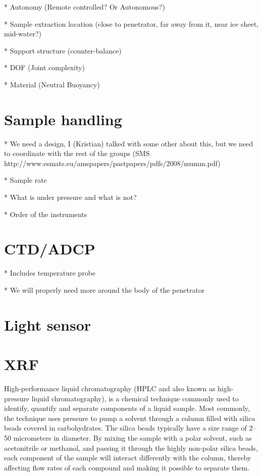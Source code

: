 * Autonomy (Remote controlled? Or Autonomous?)

* Sample extraction location (close to penetrator, far away from it, near ice sheet, mid-water?)

* Support structure (counter-balance)

* DOF (Joint complexity)

* Material (Neutral Buoyancy)
\fi

\section{Sample handling} %

* We need a design, I (Kristian) talked with some other about this, but we need to coordinate with the rest of the groups
   (SMS http://www.esmats.eu/amspapers/pastpapers/pdfs/2008/mumm.pdf)

* Sample rate

* What is under pressure and what is not?

* Order of the instruments




\section{CTD/ADCP}

* Includes temperature probe

    * We will properly need more around the body of the penetrator

\section{Light sensor}



\section{XRF}

\label{sec:hplc}
High-performance liquid chromatography (HPLC and also known as high-pressure liquid chromatography), is a chemical technique commonly used to identify, quantify and separate components of a liquid sample. Most commonly, the technique uses pressure to pump a solvent through a column filled with silica beads covered in carbohydrates. The silica beads typically have a size range of 2–50 micrometers in diameter. By mixing the sample with a polar solvent, such as acetonitrile or methanol, and passing it through the highly non-polar silica beads, each component of the sample will interact differently with the column, thereby affecting flow rates of each compound and making it possible to separate them. \cite{wiki_hplc}

